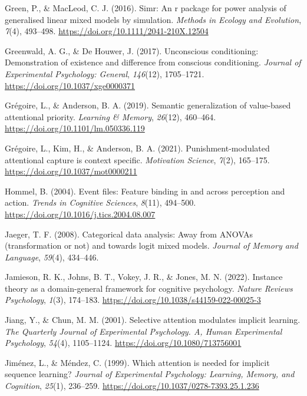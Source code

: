 \documentclass[
  man,
  floatsintext,
  longtable,
  nolmodern,
  notxfonts,
  notimes,
  mask,
  colorlinks=true,linkcolor=blue,citecolor=blue,urlcolor=blue]{apa7}
\newlength{\cslhangindent}
\newenvironment{CSLReferences}[2] %
 {\begin{list}{}{%
  \setlength{\itemindent}{0pt}
  \setlength{\leftmargin}{0pt}
  \setlength{\parsep}{0pt}
  \ifodd #1
   \setlength{\leftmargin}{\cslhangindent}
   \setlength{\itemindent}{-1\cslhangindent}
  \fi
  \setlength{\itemsep}{#2\baselineskip}}}
 {\end{list}}
\begin{document}
\begin{CSLReferences}{1}{0}
Green, P., \& MacLeod, C. J. (2016). Simr: An r package for power
analysis of generalised linear mixed models by simulation. \emph{Methods
in Ecology and Evolution}, \emph{7}(4), 493--498.
\url{https://doi.org/10.1111/2041-210X.12504}

Greenwald, A. G., \& De Houwer, J. (2017). Unconscious conditioning:
Demonstration of existence and difference from conscious conditioning.
\emph{Journal of Experimental Psychology: General}, \emph{146}(12),
1705--1721. \url{https://doi.org/10.1037/xge0000371}

Grégoire, L., \& Anderson, B. A. (2019). Semantic generalization of
value-based attentional priority. \emph{Learning \& Memory},
\emph{26}(12), 460--464. \url{https://doi.org/10.1101/lm.050336.119}

Grégoire, L., Kim, H., \& Anderson, B. A. (2021). Punishment-modulated
attentional capture is context specific. \emph{Motivation Science},
\emph{7}(2), 165--175. \url{https://doi.org/10.1037/mot0000211}

Hommel, B. (2004). Event files: Feature binding in and across perception
and action. \emph{Trends in Cognitive Sciences}, \emph{8}(11), 494--500.
\url{https://doi.org/10.1016/j.tics.2004.08.007}

Jaeger, T. F. (2008). Categorical data analysis: Away from ANOVAs
(transformation or not) and towards logit mixed models. \emph{Journal of
Memory and Language}, \emph{59}(4), 434--446.

Jamieson, R. K., Johns, B. T., Vokey, J. R., \& Jones, M. N. (2022).
Instance theory as a domain-general framework for cognitive psychology.
\emph{Nature Reviews Psychology}, \emph{1}(3), 174--183.
\url{https://doi.org/10.1038/s44159-022-00025-3}

Jiang, Y., \& Chun, M. M. (2001). Selective attention modulates implicit
learning. \emph{The Quarterly Journal of Experimental Psychology. A,
Human Experimental Psychology}, \emph{54}(4), 1105--1124.
\url{https://doi.org/10.1080/713756001}

Jiménez, L., \& Méndez, C. (1999). Which attention is needed for
implicit sequence learning? \emph{Journal of Experimental Psychology:
Learning, Memory, and Cognition}, \emph{25}(1), 236--259.
\url{https://doi.org/10.1037/0278-7393.25.1.236}


\end{CSLReferences}
\end{document}
